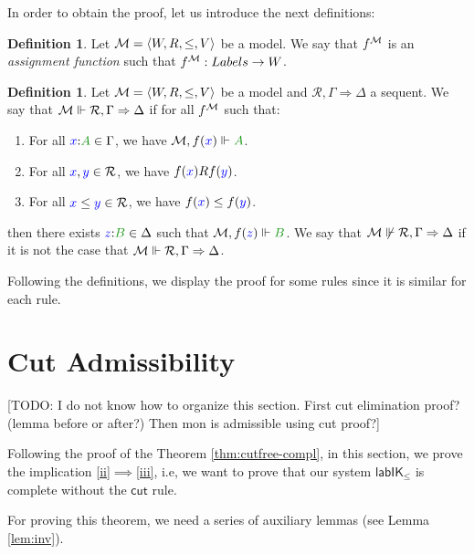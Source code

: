 \documentclass[a4paper]{article}
\theoremstyle{plain}
\theoremstyle{definition}
\newtheorem{definition}[theorem]{Definition}
\newcommand{\todo}[1]{{\color{red}[TODO: #1]}}
\newcommand{\B}{\mathcal{R}}
\newcommand*{\lab}{\mathsf{lab}}
\newcommand*{\IK}{\mathsf{IK}}
\newcommand*{\labIKp}{\lab\IK_{\le}}
\newcommand*{\fm}[1]{{\color{notgreen}{#1}}}
\newcommand*{\lb}[1]{{\color{blue}{#1}}}
\newcommand*{\labels}[2]{\lb{#1}\mathord{:}\fm{#2}}
\newcommand*{\futs}[2]{\lb{#1}\le{\color{blue}{#2}}}
\newcommand*{\rn}[1]  {\ensuremath{\mathsf{#1}}}
\newcommand*{\rel}{R}
\begin{document}
In order to obtain the proof, let us introduce the next definitions:

\begin{definition}
	Let $\M = \langle W, \rel, \le, V \rangle$ be a model. We say that $f^{\mathcal{M}}$ is an \emph{assignment function} such that $f^{\mathcal{M}} : Labels \rightarrow W$.
\end{definition} 

\begin{definition}
	Let $\M = \langle W, \rel, \le, V \rangle$ be a model and $\B, \Gamma \Rightarrow \Delta$ a sequent. We say that $\M \Vdash \B, \Gamma \Rightarrow \Delta$ if for all $f^{\mathcal{M}}$ such that:
	\begin{enumerate}
		\item For all $\labels{x}{A} \in \Gamma$, we have $\M, f(\lb x) \Vdash \fm A$.
		\item For all $\lb x, \lb y \in \B$, we have $f(\lb x) \rel f(\lb y)$.
		\item For all $\futs xy \in \B$, we have $f(\lb x) \le f(\lb y)$.
	\end{enumerate}
	then there exists $\labels{z}{B} \in \Delta$ such that $\M, f(\lb z) \Vdash \fm B$. We say that $\M \not \Vdash \B, \Gamma \Rightarrow \Delta$ if it is not the case that $\M \Vdash \B, \Gamma \Rightarrow \Delta$.
\end{definition}

Following the definitions, we display the proof for some rules since it is similar for each rule. 

\section{Cut Admissibility}\label{sec:cut-elim}

\todo{I do not know how to organize this section. First cut elimination proof? (lemma before or after?) Then mon is admissible using cut proof?}

Following the proof of the Theorem \ref{thm:cutfree-compl}, in this section, we prove the implication \ref{ii}$\implies$\ref{iii}, i.e, we want to prove that our system $\labIKp$ is complete without the \rn{cut} rule.

For proving this theorem, we need a series of auxiliary lemmas (see Lemma \ref{lem:inv}).
\end{document}

